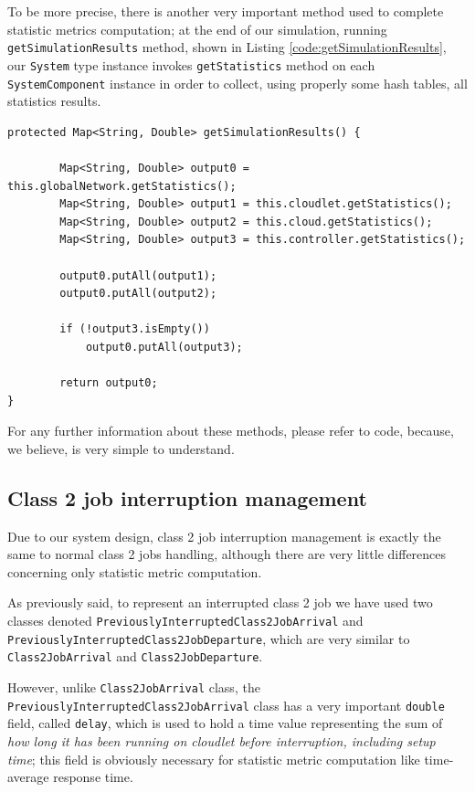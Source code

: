 \documentclass[10pt,a4paper]{article}
\begin{document}
To be more precise, there is another very important method used to complete statistic metrics computation; at the end of our simulation, running \texttt{getSimulationResults} method,  shown in Listing \ref{code:getSimulationResults}, our \texttt{System} type instance invokes \texttt{getStatistics} method on each \texttt{SystemComponent} instance in order to collect, using properly some hash tables, all statistics results.

\begin{lstlisting}[frame=lines, caption={Snippet of \texttt{getSimulationResults} method}, label={code:getSimulationResults}]
protected Map<String, Double> getSimulationResults() {

        Map<String, Double> output0 = this.globalNetwork.getStatistics();
        Map<String, Double> output1 = this.cloudlet.getStatistics();
        Map<String, Double> output2 = this.cloud.getStatistics();
        Map<String, Double> output3 = this.controller.getStatistics();

        output0.putAll(output1);
        output0.putAll(output2);

        if (!output3.isEmpty())
            output0.putAll(output3);

        return output0;
}
\end{lstlisting}

For any further information about these methods, please refer to code, because, we believe, is very simple to understand.

\subsection{Class 2 job interruption management}

Due to our system design, class 2 job interruption management is exactly the same to normal class 2 jobs handling, although there are very little differences concerning only statistic metric computation. 

As previously said, to represent an interrupted class 2 job we have used two classes denoted \texttt{PreviouslyInterruptedClass2JobArrival} and \texttt{PreviouslyInterruptedClass2JobDeparture}, which are very similar to \texttt{Class2JobArrival} and  \texttt{Class2JobDeparture}. 

However, unlike \texttt{Class2JobArrival} class, the \texttt{PreviouslyInterruptedClass2JobArrival} class has a very important \texttt{double} field, called \texttt{delay}, which is used to hold a time value representing the sum of \textit{how long it has been running on cloudlet before interruption, including setup time}; this field is obviously necessary for statistic metric computation like time-average response time.
\end{document}

